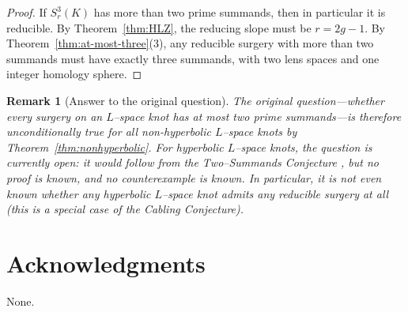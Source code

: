 \documentclass[11pt]{amsart}
\newtheorem{remark}[theorem]{Remark}
\numberwithin{equation}{section}
\begin{document}
\begin{proof}
If $S^3_r(K)$ has more than two prime summands, then in particular it is reducible.
By Theorem~\ref{thm:HLZ}, the reducing slope must be $r=2g-1$.
By Theorem~\ref{thm:at-most-three}(3), any reducible surgery with more than two summands must have exactly three
summands, with two lens spaces and one integer homology sphere.
\end{proof}

\begin{remark}[Answer to the original question]\label{rem:final-answer}
The original question---whether \emph{every} surgery on an $L$--space knot has at most two prime summands---is
therefore \emph{unconditionally true} for all non-hyperbolic $L$--space knots by Theorem~\ref{thm:nonhyperbolic}.
For hyperbolic $L$--space knots, the question is currently \emph{open}: it would follow from the Two--Summands
Conjecture \cite[Conjecture~1]{How10}, but no proof is known, and no counterexample is known.  In particular, it is
not even known whether any hyperbolic $L$--space knot admits \emph{any} reducible surgery at all (this is a special
case of the Cabling Conjecture).
\end{remark}

\section*{Acknowledgments}
None.
\end{document}
